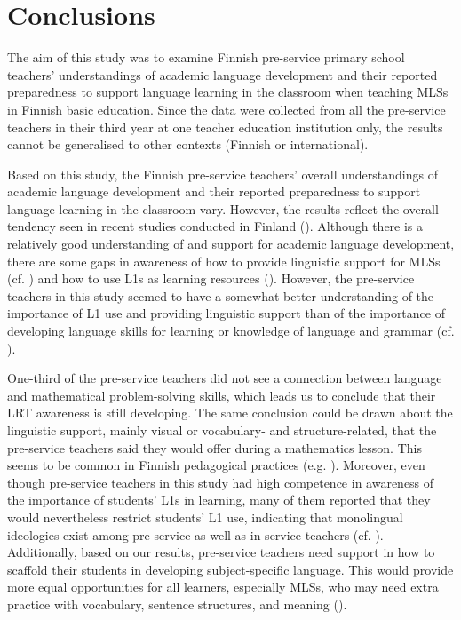 \documentclass[output=paper]{langscibook}
\begin{document}
\section{Conclusions}\label{sec:alisaari:5} %

The aim of this study was to examine Finnish pre-service primary school teachers’ understandings of academic language development and their reported preparedness to support language learning in the classroom when teaching MLSs in Finnish basic education. Since the data were collected from all the pre-service teachers in their third year at one teacher education institution only, the results cannot be generalised to other contexts (Finnish or international).

Based on this study, the Finnish pre-service teachers’ overall understandings of academic language development and their reported preparedness to support language learning in the classroom vary. However, the results reflect the overall tendency seen in recent studies conducted in Finland (\citealt{AlisaariEtAl2019,Alisaari2020_Apples,Harju-AuttiEtAl2022,HeikkolaEtAl2022,chapters/8_heikkola}). Although there is a relatively good understanding of and support for academic language development, there are some gaps in awareness of how to provide linguistic support for MLSs (cf. \citealt{Harju-AuttiSinkkonen2020}) and how to use L1s as learning resources (\citealt{AlisaariEtAl2019}). However, the pre-service teachers in this study seemed to have a somewhat better understanding of the importance of L1 use and providing linguistic support than of the importance of developing language skills for learning or knowledge of language and grammar (cf. \citealt{chapters/2_Gunnthorsdottira,chapters/5_ostergaard}).

One-third of the pre-service teachers did not see a connection between language and mathematical problem-solving skills, which leads us to conclude that their LRT awareness is still developing. The same conclusion could be drawn about the linguistic support, mainly visual or vocabulary- and structure-related, that the pre-service teachers said they would offer during a mathematics lesson. This seems to be common in Finnish pedagogical practices (e.g. \citealt{HeikkolaEtAl2022}). Moreover, even though pre-service teachers in this study had high competence in awareness of the importance of students’ L1s in learning, many of them reported that they would nevertheless restrict students’ L1 use, indicating that monolingual ideologies exist among pre-service as well as in-service teachers (cf. \citealt{AlisaariEtAl2019}). Additionally, based on our results, pre-service teachers need support in how to scaffold their students in developing subject-specific language. This would provide more equal opportunities for all learners, especially MLSs, who may need extra practice with vocabulary, sentence structures, and meaning (\citealt{ComminsMiramontes2006}).
\end{document}
